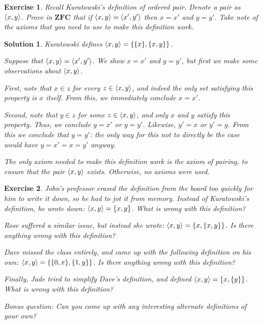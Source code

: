 \documentclass{article}
\newtheorem{ex}{Exercise}
\theoremstyle{nonumberplain}
\newtheorem{sol}{Solution}
\DeclarePairedDelimiter{\braket}{\langle}{\rangle}
\newcommand{\ZFC}{\mathbf{ZFC}}
\begin{document}
\begin{ex}
Recall Kuratowski's definition of ordered pair. Denote a pair as $\braket{x,y}$. Prove in $\ZFC$ that if $\braket{x,y} = \braket{x',y'}$ then $x = x'$ and $y = y'$. Take note of the axioms that you need to use to make this definition work.
\end{ex}

\begin{sol}
Kuratowski defines $\braket{x,y} = \{\{x\},\{x,y\}\}$.

Suppose that $\braket{x,y} = \braket{x',y'}$. We show $x = x'$ and $y = y'$, but first we make some observations about $\braket{x,y}$.

First, note that $x \in z$ for every $z \in \braket{x,y}$, and indeed the only set satisfying this property is $x$ itself. From this, we immediately conclude $x = x'$.

Second, note that $y \in z$ for \emph{some} $z \in \braket{x,y}$, and only $x$ and $y$ satisfy this property. Thus, we conclude $y = x'$ or $y = y'$. Likewise, $y' = x$ or $y' = y$. From this we conclude that $y = y'$: the only way for this not to directly be the case would have $y = x' = x = y'$ anyway.

The only axiom needed to make this definition work is the axiom of pairing, to ensure that the pair $\braket{x,y}$ exists. Otherwise, no axioms were used.
\end{sol}

\begin{ex}
John's professor erased the definition from the board too quickly for him to write it down, so he had to jot it from memory. Instead of Kuratowski's definition, he wrote down: $\braket{x,y} = \{x,y\}$. What is wrong with this definition?

Rose suffered a similar issue, but instead she wrote: $\braket{x,y} = \{x, \{x,y\}\}$. Is there anything wrong with this definition?

Dave missed the class entirely, and came up with the following definition on his own: $\braket{x,y} = \{\{0, x\}, \{1, y\}\}$. Is there anything wrong with this definition?

Finally, Jade tried to simplify Dave's definition, and defined $\braket{x,y} = \{x, \{y\}\}$. What is wrong with this definition?

Bonus question: Can you come up with any interesting alternate definitions of your own?
\end{ex}
\end{document}
